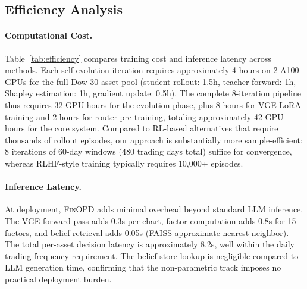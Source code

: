 \subsection{Efficiency Analysis}



\paragraph{Computational Cost.} Table~\ref{tab:efficiency} compares training cost and inference latency across methods. Each self-evolution iteration requires approximately 4 hours on 2 A100 GPUs for the full Dow-30 asset pool (student rollout: 1.5h, teacher forward: 1h, Shapley estimation: 1h, gradient update: 0.5h). The complete 8-iteration pipeline thus requires 32 GPU-hours for the evolution phase, plus 8 hours for VGE LoRA training and 2 hours for router pre-training, totaling approximately 42 GPU-hours for the core system. Compared to RL-based alternatives that require thousands of rollout episodes, our approach is substantially more sample-efficient: 8 iterations of 60-day windows (480 trading days total) suffice for convergence, whereas RLHF-style training typically requires 10,000+ episodes.

\paragraph{Inference Latency.} At deployment, \textsc{FinOPD} adds minimal overhead beyond standard LLM inference. The VGE forward pass adds 0.3s per chart, factor computation adds 0.8s for 15 factors, and belief retrieval adds 0.05s (FAISS approximate nearest neighbor). The total per-asset decision latency is approximately 8.2s, well within the daily trading frequency requirement. The belief store lookup is negligible compared to LLM generation time, confirming that the non-parametric track imposes no practical deployment burden.
